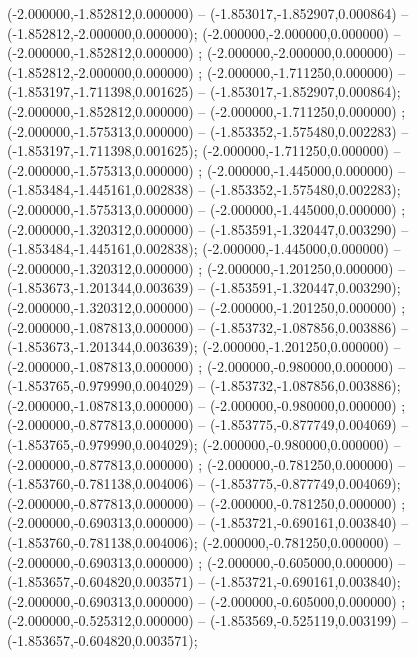 (-2.000000,-1.852812,0.000000) -- (-1.853017,-1.852907,0.000864) -- (-1.852812,-2.000000,0.000000);
 (-2.000000,-2.000000,0.000000) -- (-2.000000,-1.852812,0.000000) ;
 (-2.000000,-2.000000,0.000000) -- (-1.852812,-2.000000,0.000000) ;
 (-2.000000,-1.711250,0.000000) -- (-1.853197,-1.711398,0.001625) -- (-1.853017,-1.852907,0.000864);
 (-2.000000,-1.852812,0.000000) -- (-2.000000,-1.711250,0.000000) ;
 (-2.000000,-1.575313,0.000000) -- (-1.853352,-1.575480,0.002283) -- (-1.853197,-1.711398,0.001625);
 (-2.000000,-1.711250,0.000000) -- (-2.000000,-1.575313,0.000000) ;
 (-2.000000,-1.445000,0.000000) -- (-1.853484,-1.445161,0.002838) -- (-1.853352,-1.575480,0.002283);
 (-2.000000,-1.575313,0.000000) -- (-2.000000,-1.445000,0.000000) ;
 (-2.000000,-1.320312,0.000000) -- (-1.853591,-1.320447,0.003290) -- (-1.853484,-1.445161,0.002838);
 (-2.000000,-1.445000,0.000000) -- (-2.000000,-1.320312,0.000000) ;
 (-2.000000,-1.201250,0.000000) -- (-1.853673,-1.201344,0.003639) -- (-1.853591,-1.320447,0.003290);
 (-2.000000,-1.320312,0.000000) -- (-2.000000,-1.201250,0.000000) ;
 (-2.000000,-1.087813,0.000000) -- (-1.853732,-1.087856,0.003886) -- (-1.853673,-1.201344,0.003639);
 (-2.000000,-1.201250,0.000000) -- (-2.000000,-1.087813,0.000000) ;
 (-2.000000,-0.980000,0.000000) -- (-1.853765,-0.979990,0.004029) -- (-1.853732,-1.087856,0.003886);
 (-2.000000,-1.087813,0.000000) -- (-2.000000,-0.980000,0.000000) ;
 (-2.000000,-0.877813,0.000000) -- (-1.853775,-0.877749,0.004069) -- (-1.853765,-0.979990,0.004029);
 (-2.000000,-0.980000,0.000000) -- (-2.000000,-0.877813,0.000000) ;
 (-2.000000,-0.781250,0.000000) -- (-1.853760,-0.781138,0.004006) -- (-1.853775,-0.877749,0.004069);
 (-2.000000,-0.877813,0.000000) -- (-2.000000,-0.781250,0.000000) ;
 (-2.000000,-0.690313,0.000000) -- (-1.853721,-0.690161,0.003840) -- (-1.853760,-0.781138,0.004006);
 (-2.000000,-0.781250,0.000000) -- (-2.000000,-0.690313,0.000000) ;
 (-2.000000,-0.605000,0.000000) -- (-1.853657,-0.604820,0.003571) -- (-1.853721,-0.690161,0.003840);
 (-2.000000,-0.690313,0.000000) -- (-2.000000,-0.605000,0.000000) ;
 (-2.000000,-0.525312,0.000000) -- (-1.853569,-0.525119,0.003199) -- (-1.853657,-0.604820,0.003571);

